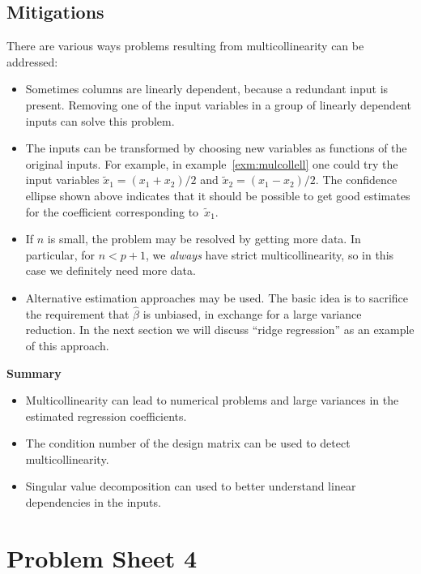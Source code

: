 \documentclass[
  a4paper,
]{article}
\providecommand{\tightlist}{%
  \setlength{\itemsep}{0pt}\setlength{\parskip}{0pt}}
\theoremstyle{definition}
\theoremstyle{definition}
\theoremstyle{definition}
\theoremstyle{definition}
\theoremstyle{remark}
\begin{document}
\subsection{Mitigations}\label{mitigations}

There are various ways problems resulting from multicollinearity can
be addressed:

\begin{itemize}
\item
  Sometimes columns are linearly dependent, because a redundant input
  is present. Removing one of the input variables in a group
  of linearly dependent inputs can solve this problem.
\item
  The inputs can be transformed by choosing new variables as functions
  of the original inputs. For example, in example~\ref{exm:mulcollell}
  one could try the input variables \(\tilde x_1 = (x_1 + x_2) / 2\) and
  \(\tilde x_2 = (x_1 - x_2) / 2\). The confidence ellipse shown above
  indicates that it should be possible to get good estimates for the
  coefficient corresponding to~\(\tilde x_1\).
\item
  If \(n\) is small, the problem may be resolved by getting more data.
  In particular, for \(n < p+1\), we \emph{always} have strict multicollinearity,
  so in this case we definitely need more data.
\item
  Alternative estimation approaches may be used. The basic idea is to sacrifice the
  requirement that \(\hat\beta\) is unbiased, in exchange for a large variance
  reduction. In the next section we will discuss ``ridge regression'' as an
  example of this approach.
\end{itemize}

\textbf{Summary}

\begin{itemize}
\tightlist
\item
  Multicollinearity can lead to numerical problems and large variances in the
  estimated regression coefficients.
\item
  The condition number of the design matrix can be used to detect
  multicollinearity.
\item
  Singular value decomposition can used to better understand linear
  dependencies in the inputs.
\end{itemize}

\clearpage

\section*{Problem Sheet 4}\label{P04}
\end{document}
